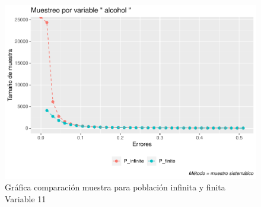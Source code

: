 \documentclass[
]{article}
\begin{document}
\begin{figure}
\centering
\includegraphics{1_examen_solucion_files/figure-latex/grafica sys11-1.pdf}
\caption{Gráfica comparación muestra para población infinita y finita
Variable 11}
\end{figure}
\end{document}
